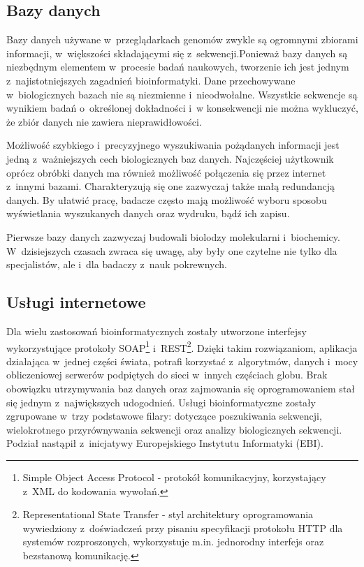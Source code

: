 \documentclass[a4paper,12pt,oneside]{mwrep}  %
\begin{document}
\subsection{Bazy danych}
Bazy danych używane w~przeglądarkach genomów zwykle są ogromnymi zbiorami informacji, w~większości składającymi się z~sekwencji.Ponieważ bazy danych są niezbędnym elementem w~procesie badań naukowych, tworzenie ich jest jednym z~najistotniejszych zagadnień bioinformatyki. Dane przechowywane w~biologicznych bazach nie są niezmienne i~nieodwołalne. Wszystkie sekwencje są wynikiem badań o~określonej dokładności i~w konsekwencji nie można wykluczyć, że zbiór danych nie zawiera nieprawidłowości. %

Możliwość szybkiego i~precyzyjnego wyszukiwania pożądanych informacji jest jedną z~ważniejszych cech biologicznych baz danych. Najczęściej użytkownik oprócz obróbki danych ma również możliwość połączenia się przez internet z~innymi bazami. Charakteryzują się one zazwyczaj także małą redundancją danych. By ułatwić pracę, badacze często mają możliwość wyboru sposobu wyświetlania wyszukanych danych oraz wydruku, bądź ich zapisu. %

Pierwsze bazy danych zazwyczaj budowali biolodzy molekularni i~biochemicy. W~dzisiejszych czasach zwraca się uwagę, aby były one czytelne nie tylko dla specjalistów, ale i~dla badaczy z~nauk pokrewnych. %

\subsection{Usługi internetowe}
Dla wielu zastosowań bioinformatycznych zostały utworzone interfejsy wykorzystujące protokoły SOAP\footnote{Simple Object Access Protocol - protokół komunikacyjny, korzystający z~XML do kodowania wywołań. %
} i~REST\footnote{Representational State Transfer - styl architektury oprogramowania wywiedziony z~doświadczeń przy pisaniu specyfikacji protokołu HTTP dla systemów rozproszonych, wykorzystuje m.in. jednorodny interfejs oraz bezstanową komunikację. %
}. Dzięki takim rozwiązaniom, aplikacja działająca w~jednej części świata, potrafi korzystać z~algorytmów, danych i~mocy obliczeniowej serwerów podpiętych do sieci w~innych częściach globu. Brak obowiązku utrzymywania baz danych oraz zajmowania się oprogramowaniem stał się jednym z~największych udogodnień. Usługi bioinformatyczne zostały zgrupowane w~trzy podstawowe filary: dotyczące poszukiwania sekwencji, wielokrotnego przyrównywania sekwencji oraz analizy biologicznych sekwencji. Podział nastąpił z~inicjatywy Europejskiego Instytutu Informatyki (EBI). %
\end{document}
